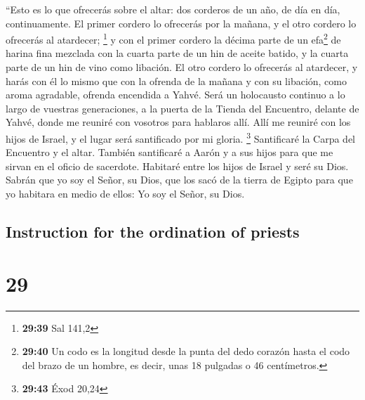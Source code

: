 \begin{paracol}{2}
 ``Esto es lo que ofrecerás sobre el altar: dos corderos
de un año, de día en día, continuamente.  El primer
cordero lo ofrecerás por la mañana, y el otro cordero lo ofrecerás al
atardecer; \footnote{\textbf{29:39} Sal 141,2}  y con el
primer cordero la décima parte de un efa\footnote{\textbf{29:40} Un codo
  es la longitud desde la punta del dedo corazón hasta el codo del brazo
  de un hombre, es decir, unas 18 pulgadas o 46 centímetros.} de harina
fina mezclada con la cuarta parte de un hin de aceite batido, y la
cuarta parte de un hin de vino como libación.  El otro
cordero lo ofrecerás al atardecer, y harás con él lo mismo que con la
ofrenda de la mañana y con su libación, como aroma agradable, ofrenda
encendida a Yahvé.  Será un holocausto continuo a lo
largo de vuestras generaciones, a la puerta de la Tienda del Encuentro,
delante de Yahvé, donde me reuniré con vosotros para hablaros allí.
 Allí me reuniré con los hijos de Israel, y el lugar será
santificado por mi gloria. \footnote{\textbf{29:43} Éxod 20,24}
 Santificaré la Carpa del Encuentro y el altar. También
santificaré a Aarón y a sus hijos para que me sirvan en el oficio de
sacerdote.  Habitaré entre los hijos de Israel y seré su
Dios.  Sabrán que yo soy el Señor, su Dios, que los sacó
de la tierra de Egipto para que yo habitara en medio de ellos: Yo soy el
Señor, su Dios.

\switchcolumn
\begin{otherlanguage}{english}

\hypertarget{instruction-for-the-ordination-of-priests}{%
\subsection{Instruction for the ordination of
priests}\label{instruction-for-the-ordination-of-priests}}

\hypertarget{section-57}{%
\section{29}\label{section-57}}


\end{otherlanguage}
\end{paracol}
